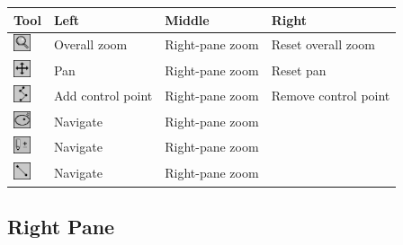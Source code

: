 \documentclass[12pt]{report}
\begin{document}
\begin{center}
\begin{tabular}{|l|l|l|l|}
\hline
Tool & Left & Middle & Right \\ %
\hline
\includegraphics[width=14pt]{zoom0.eps}   & Overall zoom & Right-pane zoom & Reset overall zoom  \\
\includegraphics[width=14pt]{pan0.eps}    & Pan          & Right-pane zoom & Reset pan \\
\includegraphics[width=14pt]{normal0.eps} & Add control point & Right-pane zoom & Remove control point \\
\includegraphics[width=14pt]{auto0.eps}   & Navigate     & Right-pane zoom &  \\
\includegraphics[width=14pt]{manual0.eps} & Navigate     & Right-pane zoom &  \\
\includegraphics[width=14pt]{dist0.eps}   & Navigate     & Right-pane zoom &  \\
\hline
\end{tabular}
\end{center}

\subsection{Right Pane}
\end{document}
